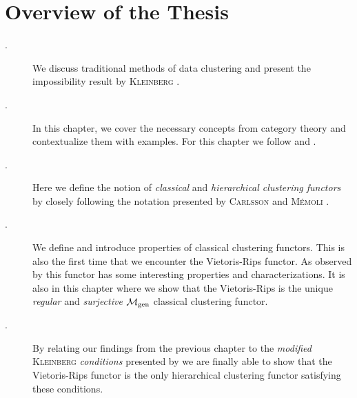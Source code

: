 \section*{Overview of the Thesis}
\begin{description}

    \item[.] We discuss traditional methods of data clustering and present the impossibility result by \textsc{Kleinberg} \cite{Kleinberg2002}.

    \item[.] In this chapter, we cover the necessary concepts from category theory and contextualize them with examples. For this chapter we follow \cite{Roman2017} and \cite{Leinster2014-dc}.

    \item[.] Here we define the notion of \emph{classical} and \emph{hierarchical clustering functors} by closely following the notation presented by \textsc{Carlsson} and \textsc{M\'emoli} \cite{Carlsson2010}.

    \item[.] We define and introduce properties of classical clustering functors. This is also the first time that we encounter the Vietoris-Rips functor. As observed by \cite{Carlsson2010} this functor has some interesting properties and characterizations. It is also in this chapter where we show that the Vietoris-Rips is the unique \emph{regular} and \emph{surjective} ${\mathcal{M}_\mathrm{gen}}$ classical clustering functor.

    \item[.] By relating our findings from the previous chapter to the \emph{modified} \textsc{Kleinberg} \emph{conditions} presented by \cite[Sec.~7.3.1]{Carlsson2010} we are finally able to show that the Vietoris-Rips functor is the only hierarchical clustering functor satisfying these conditions.
\end{description}

